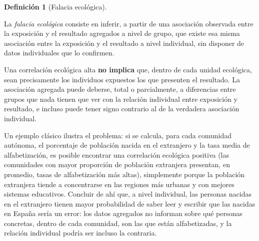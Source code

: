 \documentclass[
  spanish,
  a4paper,
]{scrreport}
\theoremstyle{definition}
\theoremstyle{definition}
\newtheorem{definition}{Definición}[chapter]
\theoremstyle{remark}
\begin{document}
\begin{definition}[Falacia
ecológica]\protect\hypertarget{def-ecologicos-falacia-ecologica}{}\label{def-ecologicos-falacia-ecologica}

La \emph{falacia ecológica} consiste en inferir, a partir de una
asociación observada entre la exposición y el resultado agregados a
nivel de grupo, que existe esa misma asociación entre la exposición y el
resultado a nivel individual, sin disponer de datos individuales que lo
confirmen.

\end{definition}

\begin{tcolorbox}[enhanced jigsaw, arc=.35mm, bottomrule=.15mm, bottomtitle=1mm, breakable, colback=white, colbacktitle=quarto-callout-warning-color!10!white, colframe=quarto-callout-warning-color-frame, coltitle=black, left=2mm, leftrule=.75mm, opacityback=0, opacitybacktitle=0.6, rightrule=.15mm, title=\textcolor{quarto-callout-warning-color}{\faExclamationTriangle}\hspace{0.5em}{Advertencia}, titlerule=0mm, toprule=.15mm, toptitle=1mm]

Una correlación ecológica alta \textbf{no implica} que, dentro de cada
unidad ecológica, sean precisamente los individuos expuestos los que
presenten el resultado. La asociación agregada puede deberse, total o
parcialmente, a diferencias entre grupos que nada tienen que ver con la
relación individual entre exposición y resultado, e incluso puede tener
signo contrario al de la verdadera asociación individual.

Un ejemplo clásico ilustra el problema: si se calcula, para cada
comunidad autónoma, el porcentaje de población nacida en el extranjero y
la tasa media de alfabetización, es posible encontrar una correlación
ecológica positiva (las comunidades con mayor proporción de población
extranjera presentan, en promedio, tasas de alfabetización más altas),
simplemente porque la población extranjera tiende a concentrarse en las
regiones más urbanas y con mejores sistemas educativos. Concluir de ahí
que, a nivel individual, las personas nacidas en el extranjero tienen
mayor probabilidad de saber leer y escribir que las nacidas en España
sería un error: los datos agregados no informan sobre qué personas
concretas, dentro de cada comunidad, son las que están alfabetizadas, y
la relación individual podría ser incluso la contraria.

\end{tcolorbox}
\end{document}
